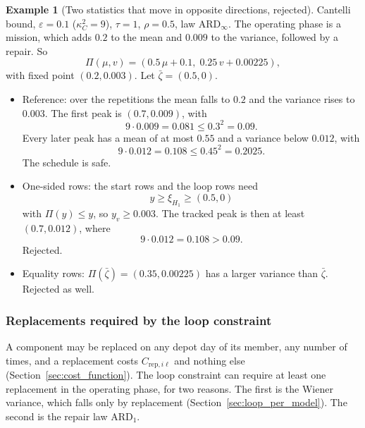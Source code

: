 \documentclass[11pt,a4paper]{article}
\theoremstyle{plain}
\theoremstyle{definition}
\newtheorem{example}[theorem]{Example}
\theoremstyle{remark}
\begin{document}
\begin{example}[Two statistics that move in opposite directions, rejected]
Cantelli bound, $\varepsilon = 0.1$ ($\kappa_C^2 = 9$), $\tau = 1$, $\rho = 0.5$, law $\text{ARD}_\infty$.
The operating phase is a mission, which adds $0.2$ to the mean and $0.009$ to the variance, followed by a repair.
So
\begin{equation}
  \Pi(\mu, v) = (0.5\,\mu + 0.1,\; 0.25\,v + 0.00225),
\end{equation}
with fixed point $(0.2, 0.003)$.
Let $\bar\zeta = (0.5, 0)$.
\begin{itemize}
  \item Reference: over the repetitions the mean falls to $0.2$ and the variance rises to $0.003$.
    The first peak is $(0.7, 0.009)$, with
    \begin{equation}
      9 \cdot 0.009 = 0.081 \le 0.3^2 = 0.09.
    \end{equation}
    Every later peak has a mean of at most $0.55$ and a variance below $0.012$, with
    \begin{equation}
      9 \cdot 0.012 = 0.108 \le 0.45^2 = 0.2025.
    \end{equation}
    The schedule is safe.
  \item One-sided rows: the start rows and the loop rows need
    \begin{equation}
      y \ge \xi_{H_1} \ge (0.5, 0)
    \end{equation}
    with $\Pi(y) \le y$, so $y_v \ge 0.003$.
    The tracked peak is then at least $(0.7, 0.012)$, where
    \begin{equation}
      9 \cdot 0.012 = 0.108 > 0.09.
    \end{equation}
    Rejected.
  \item Equality rows: $\Pi(\bar\zeta) = (0.35, 0.00225)$ has a larger variance than $\bar\zeta$.
    Rejected as well.
\end{itemize}
\end{example}

\subsubsection{Replacements required by the loop constraint}
\label{sec:loop_replacements}

A component may be replaced on any depot day of its member, any number of times, and a replacement costs $C_{\mathrm{rep},i\ell}$ and nothing else (Section~\ref{sec:cost_function}).
The loop constraint can require at least one replacement in the operating phase, for two reasons.
The first is the Wiener variance, which falls only by replacement (Section~\ref{sec:loop_per_model}).
The second is the repair law $\text{ARD}_1$.
\end{document}
